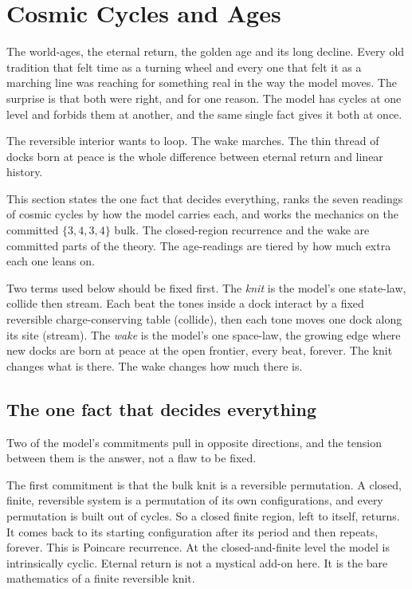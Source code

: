 \section{Cosmic Cycles and Ages}

The world-ages, the eternal return, the golden age and its long decline. Every old tradition that felt time as a turning wheel and every one that felt it as a marching line was reaching for something real in the way the model moves. The surprise is that both were right, and for one reason. The model has cycles at one level and forbids them at another, and the same single fact gives it both at once.

\begin{principle}
The reversible interior wants to loop. The wake marches. The thin thread of docks born at peace is the whole difference between eternal return and linear history.
\end{principle}

This section states the one fact that decides everything, ranks the seven readings of cosmic cycles by how the model carries each, and works the mechanics on the committed $\{3,4,3,4\}$ bulk. The closed-region recurrence and the wake are committed parts of the theory. The age-readings are tiered by how much extra each one leans on.

Two terms used below should be fixed first. The \emph{knit} is the model's one state-law, collide then stream. Each beat the tones inside a dock interact by a fixed reversible charge-conserving table (collide), then each tone moves one dock along its site (stream). The \emph{wake} is the model's one space-law, the growing edge where new docks are born at peace at the open frontier, every beat, forever. The knit changes what is there. The wake changes how much there is.

\subsection{The one fact that decides everything}

Two of the model's commitments pull in opposite directions, and the tension between them is the answer, not a flaw to be fixed.

The first commitment is that the bulk knit is a reversible permutation. A closed, finite, reversible system is a permutation of its own configurations, and every permutation is built out of cycles. So a closed finite region, left to itself, returns. It comes back to its starting configuration after its period and then repeats, forever. This is Poincare recurrence. At the closed-and-finite level the model is intrinsically cyclic. Eternal return is not a mystical add-on here. It is the bare mathematics of a finite reversible knit.

